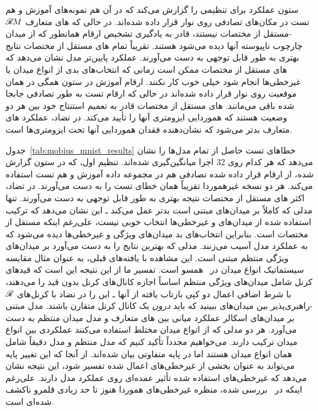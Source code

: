 \begin{table}
{		ستون  عملکرد برای تنظیمی را گزارش می‌کند که در آن هم نمونه‌های آموزش و هم تست در مکان‌های تصادفی روی نوار قرار داده شده‌اند.
		در حالی که های متعارف $\mathscr{R}\mkern-1.8muM$-مستقل از مختصات نیستند، قادر به یادگیری تشخیص ارقام همانطور که از میدان چارچوب ناپیوسته آنها دیده می‌شود هستند.
		تقریباً تمام های مستقل از مختصات نتایج بهتری به طور قابل توجهی به دست می‌آورند.
		عملکرد پایین‌تر مدل  نشان می‌دهد که های مستقل از مختصات ممکن است زمانی که انتخاب‌های بدی از انواع میدان یا غیرخطی‌ها انجام شود خیلی خوب کار نکنند.
		ارقام آموزش در ستون  همگی در همان موقعیت روی نوار قرار داده شده‌اند در حالی که ارقام تست به طور تصادفی جابجا شده باقی می‌مانند.
		های مستقل از مختصات قادر به تعمیم استنتاج خود بین هر دو وضعیت هستند که هموردایی ایزومتری آنها را تأیید می‌کند.
		در تضاد، عملکرد های متعارف بدتر می‌شود که نشان‌دهنده فقدان هموردایی آنها تحت ایزومتری‌ها است.
	}
	\label{tab:mobius_mnist_results}
\end{table}

جدول~\ref{tab:mobius_mnist_results} خطاهای تست حاصل از تمام مدل‌ها را نشان می‌دهد که هر کدام روی $32$ اجرا میانگین‌گیری شده‌اند.
تنظیم اول، که در ستون  گزارش شده، از ارقام قرار داده شده تصادفی هم در مجموعه داده آموزش و هم تست استفاده می‌کند.
هر دو نسخه  غیرهموردا تقریباً همان خطای تست را به دست می‌آورند.
در تضاد، اکثر های مستقل از مختصات نتیجه بهتری به طور قابل توجهی به دست می‌آورند.
تنها مدلی که کاملاً بر میدان‌های  مبتنی است بدتر عمل می‌کند ـ این نشان می‌دهد که ترکیب استفاده شده از میدان‌های  و غیرخطی‌ها انتخاب خوبی نیست، علی‌رغم اینکه مستقل از مختصات است.
بنابراین انتخاب‌های بد میدان‌های ویژگی و غیرخطی‌ها دیده می‌شود که به عملکرد مدل آسیب می‌زنند.
مدلی که بهترین نتایج را به دست می‌آورد بر میدان‌های ویژگی منتظم مبتنی است.
این مشاهده با یافته‌های قبلی، به عنوان مثال مقایسه سیستماتیک انواع میدان در~\cite{Weiler2019_E2CNN} همسو است.
تفسیر ما از این نتیجه این است که قیدهای کرنل شامل میدان‌های ویژگی منتظم اساساً اجازه کانال‌های کرنل بدون قید را می‌دهند، با شرط اضافی اعمال دو کپی بازتاب یافته از آنها ـ این را در تضاد با کرنل‌های $\mathscr{R}$-راهبری‌پذیر بین میدان‌های  ببینید که باید \emph{درون} یک کانال کرنل متقارن باشند.
مدل مبتنی بر میدان‌های اسکالر عملکرد میانی بین های متعارف و مدل میدان منتظم به دست می‌آورد.
هر دو مدلی که از انواع میدان مختلط استفاده می‌کنند عملکردی بین انواع میدان ترکیب دارند.
می‌خواهیم مجدداً تأکید کنیم که مدل منتظم و مدل  دقیقاً شامل همان انواع میدان  هستند اما در پایه متفاوتی بیان شده‌اند.
از آنجا که این تغییر پایه می‌تواند به عنوان بخشی از غیرخطی‌های اعمال شده تفسیر شود، این نتیجه نشان می‌دهد که غیرخطی‌های استفاده شده تأثیر عمده‌ای روی عملکرد مدل دارند.
علی‌رغم اینکه در~\cite{Weiler2019_E2CNN} بررسی شده، منظره غیرخطی‌های هموردا هنوز تا حد زیادی قلمرو ناکشف شده‌ای است.

